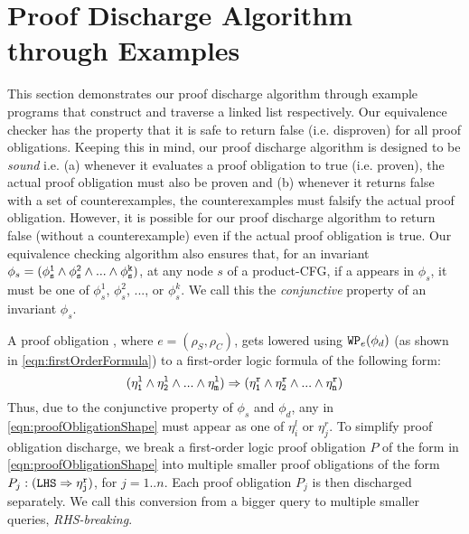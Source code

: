 \section{Proof Discharge Algorithm through Examples}
\label{sec:syn-examples}
This section demonstrates our proof discharge algorithm through example programs
that construct and traverse a linked list respectively. Our equivalence checker has the property
that it is safe to return false (i.e. disproven) for all proof obligations. Keeping this in mind,
our proof discharge algorithm is designed to be {\em sound} i.e. (a) whenever it evaluates a proof obligation
to true (i.e. proven), the actual proof obligation must also be proven and (b) whenever it returns
false with a set of counterexamples, the counterexamples must falsify the actual proof obligation.
However, it is possible for our proof discharge algorithm to return false (without a counterexample)
even if the actual proof obligation is true.
Our equivalence checking algorithm also ensures that, for an invariant
$\phi_s=({\tt \phi^{1}_s \land \phi^{2}_s \land ... \land \phi^{k}_s})$,
at any node $s$ of a product-CFG,
if a \recursiveRelation{} appears in $\phi_s$, it
must be one of $\phi^{1}_s$, $\phi^{2}_s$, ..., or $\phi^{k}_s$. We call
this the {\em conjunctive \recursiveRelation{}} property of an invariant $\phi_s$.

A proof obligation
, where $e=(\rho_S,\rho_C)$,
gets lowered using
${\tt WP}_{e}(\phi_d)$ (as shown in \cref{eqn:firstOrderFormula}) to a first-order logic formula of the following form:
\begin{equation}
\label{eqn:proofObligationShape}
({\tt \eta^{l}_1 \land \eta^{l}_2 \land ... \land \eta^{l}_m}) \Rightarrow ({\tt \eta^{r}_1 \land \eta^{r}_2 \land ... \land \eta^{r}_n})
\end{equation}
Thus, due to the conjunctive \recursiveRelation{} property of $\phi_s$ and $\phi_d$, any
\recursiveRelation{} in \cref{eqn:proofObligationShape} must appear as
one of $\eta^{l}_i$ or $\eta^{r}_j$.
To simplify proof obligation discharge,
we break a first-order logic proof obligation $P$ of the form in \cref{eqn:proofObligationShape}
into multiple smaller proof obligations
of the form
$P_j:({\tt LHS}\Rightarrow{\tt \eta^{r}_j})$, for $j=1..n$. Each proof obligation
$P_j$ is then discharged separately.  We call this conversion from
a bigger query to multiple smaller queries, {\em RHS-breaking}.

